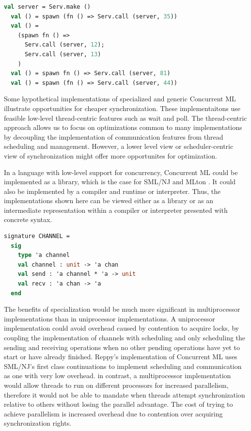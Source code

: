 \documentclass[letterpaper, 11pt]{extarticle}
\begin{document}
\begin{lstlisting}[language=ML, mathescape]
  val server = Serv.make ()
  val () = spawn (fn () => Serv.call (server, 35))
  val () =
    (spawn fn () => 
      Serv.call (server, 12); 
      Serv.call (server, 13)
    )
  val () = spawn fn () => Serv.call (server, 81)
  val () = spawn (fn () => Serv.call (server, 44))
\end{lstlisting}


Some hypothetical implementations of specialized and generic
Concurrent ML illustrate opportunities
for cheaper synchronization. These implementaitons use 
feasible low-level thread-centric features such as wait and poll.  The thread-centric approach
allows us to focus on optimizations common to many implementations by decoupling the
implementation of communication features from thread scheduling and management. However, a
lower level view or scheduler-centric view of synchronization might offer more opportunites
for optimization.

In a language with low-level support for concurrency,
Concurrent ML could be implemented as a library,
which is the case for SML/NJ \cite{smlnj} and MLton \cite{mlton}.
It could also be implemented by a compiler and runtime or interpreter.
Thus, the implementations shown here can be viewed either as a library or as an intermediate
representation within a compiler or interpreter presented with concrete syntax.

\begin{lstlisting}[language=ML, mathescape]
  signature CHANNEL =
  sig
    type 'a channel 
    val channel : unit -> 'a chan
    val send : 'a channel * 'a -> unit
    val recv : 'a chan -> 'a
  end     
\end{lstlisting}

The benefits of specialization would be much more significant in multiprocessor
implementations than in uniprocessor implementations. A uniprocessor
implementation could avoid overhead caused by contention to acquire locks, by coupling the
implementation of channels with scheduling and only scheduling the sending and receiving
operations when no other pending operations have yet to start or have already finished.
Reppy's implementation of
Concurrent ML uses SML/NJ's first class continuations to implement scheduling and communication
as one with very low overhead. in contrast, a multiprocessor
implementation would allow threads to run
on different processors for increased parallelism,
therefore it would not be able to mandate when
threads attempt synchronization relative to others without losing the parallel advantage.
The cost of trying to achieve parallelism
is increased overhead due to contention over acquiring
synchronization rights. 
\end{document}

